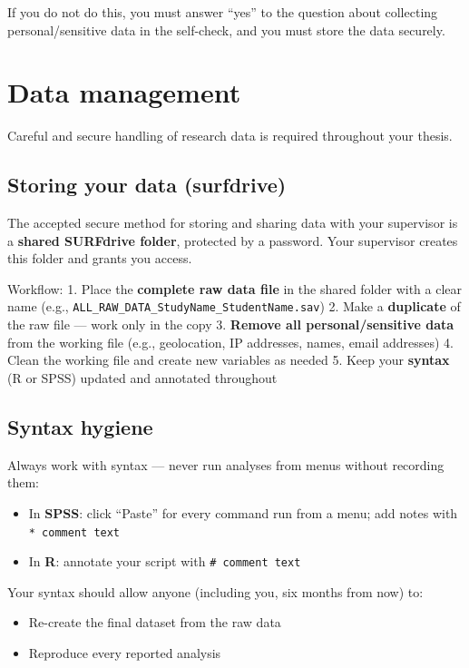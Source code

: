 \documentclass[
  11pt,
  a4paper,
]{scrbook}
\providecommand{\tightlist}{%
  \setlength{\itemsep}{0pt}\setlength{\parskip}{0pt}}\usepackage{longtable,booktabs,array}
\begin{document}
If you do not do this, you must answer ``yes'' to the question about
collecting personal/sensitive data in the self-check, and you must store
the data securely.

\section{Data management}\label{data-management}

Careful and secure handling of research data is required throughout your
thesis.

\subsection{Storing your data
(surfdrive)}\label{storing-your-data-surfdrive}

The accepted secure method for storing and sharing data with your
supervisor is a \textbf{shared SURFdrive folder}, protected by a
password. Your supervisor creates this folder and grants you access.

Workflow: 1. Place the \textbf{complete raw data file} in the shared
folder with a clear name (e.g.,
\texttt{ALL\_RAW\_DATA\_StudyName\_StudentName.sav}) 2. Make a
\textbf{duplicate} of the raw file --- work only in the copy 3.
\textbf{Remove all personal/sensitive data} from the working file (e.g.,
geolocation, IP addresses, names, email addresses) 4. Clean the working
file and create new variables as needed 5. Keep your \textbf{syntax} (R
or SPSS) updated and annotated throughout

\subsection{Syntax hygiene}\label{syntax-hygiene}

Always work with syntax --- never run analyses from menus without
recording them:

\begin{itemize}
\tightlist
\item
  In \textbf{SPSS}: click ``Paste'' for every command run from a menu;
  add notes with \texttt{*\ comment\ text}
\item
  In \textbf{R}: annotate your script with \texttt{\#\ comment\ text}
\end{itemize}

Your syntax should allow anyone (including you, six months from now) to:

\begin{itemize}
\tightlist
\item
  Re-create the final dataset from the raw data
\item
  Reproduce every reported analysis
\end{itemize}
\end{document}
